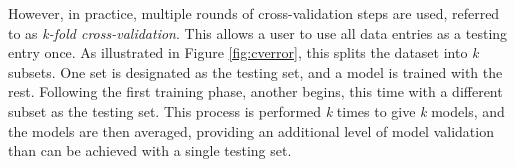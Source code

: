 However, in practice, multiple rounds of cross-validation steps are used,
referred to as \textit{k-fold cross-validation}. This allows a user to use all
data entries as a testing entry once.  As illustrated in Figure
\ref{fig:cverror}, this splits the dataset into \textit{k} subsets. One set is
designated as the testing set, and a model is trained with the rest. Following
the first training phase, another begins, this time with a different subset as
the testing set.  This process is performed \textit{k} times to give \textit{k}
models, and the models are then averaged, providing an additional level of
model validation than can be achieved with a single testing set.

